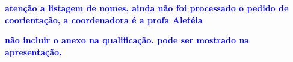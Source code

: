 \documentclass[qualificacao,mestrado,ppca]{UnB-CIC}%
\newcommand{\gnramos}[1]{\textcolor{blue}{\textbf{#1}}}%
\begin{document}
%
	\gnramos{atenção a listagem de nomes, ainda não foi processado o pedido de coorientação, a coordenadora é a profa Aletéia}
    


	\gnramos{não incluir o anexo na qualificação. pode ser mostrado na apresentação.}
\end{document}
